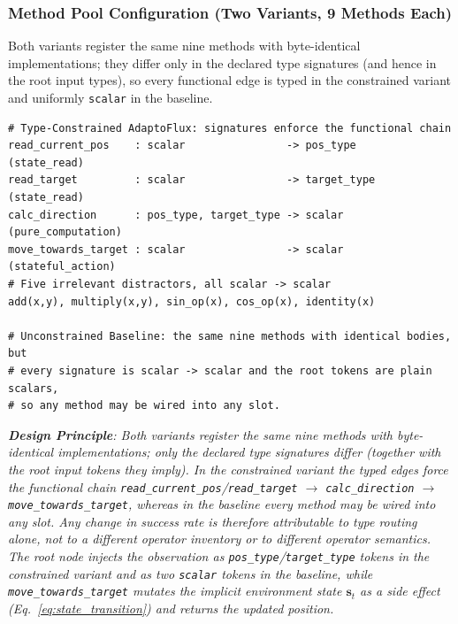 \subsubsection{Method Pool Configuration (Two Variants, 9 Methods Each)}
Both variants register the same nine methods with byte-identical implementations; they differ only in the declared type signatures (and hence in the root input types), so every functional edge is typed in the constrained variant and uniformly \texttt{scalar} in the baseline.
\begin{lstlisting}[style=plaincode]
# Type-Constrained AdaptoFlux: signatures enforce the functional chain
read_current_pos    : scalar                -> pos_type     (state_read)
read_target         : scalar                -> target_type  (state_read)
calc_direction      : pos_type, target_type -> scalar       (pure_computation)
move_towards_target : scalar                -> scalar       (stateful_action)
# Five irrelevant distractors, all scalar -> scalar
add(x,y), multiply(x,y), sin_op(x), cos_op(x), identity(x)

# Unconstrained Baseline: the same nine methods with identical bodies, but
# every signature is scalar -> scalar and the root tokens are plain scalars,
# so any method may be wired into any slot.
\end{lstlisting}

\textit{\textbf{Design Principle}: Both variants register the same nine methods with byte-identical implementations; only the declared type signatures differ (together with the root input tokens they imply). In the constrained variant the typed edges force the functional chain \texttt{read\_current\_pos}/\texttt{read\_target} $\rightarrow$ \texttt{calc\_direction} $\rightarrow$ \texttt{move\_towards\_target}, whereas in the baseline every method may be wired into any slot. Any change in success rate is therefore attributable to type routing alone, not to a different operator inventory or to different operator semantics. The root node injects the observation as \texttt{pos\_type}/\texttt{target\_type} tokens in the constrained variant and as two \texttt{scalar} tokens in the baseline, while \texttt{move\_towards\_target} mutates the implicit environment state $\mathbf{s}_t$ as a side effect (Eq.~\ref{eq:state_transition}) and returns the updated position.}

